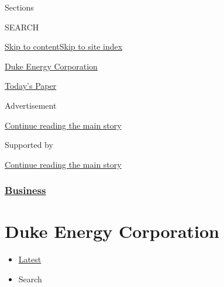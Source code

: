 Sections

SEARCH

\protect\hyperlink{site-content}{Skip to
content}\protect\hyperlink{site-index}{Skip to site index}

\href{https://www.nytimes3xbfgragh.onion/topic/company/duke-energy-corporation}{Duke
Energy Corporation}

\href{https://myaccount.nytimes3xbfgragh.onion/auth/login?response_type=cookie\&client_id=vi}{}

\href{https://www.nytimes3xbfgragh.onion/section/todayspaper}{Today's
Paper}

Advertisement

\protect\hyperlink{after-top}{Continue reading the main story}

Supported by

\protect\hyperlink{after-sponsor}{Continue reading the main story}

\hypertarget{business}{%
\subsubsection{\texorpdfstring{\href{/section/business}{Business}}{Business}}\label{business}}

\hypertarget{duke-energy-corporation}{%
\section{Duke Energy Corporation}\label{duke-energy-corporation}}

\begin{itemize}
\tightlist
\item
  \protect\hyperlink{stream-panel}{Latest}
\item
  Search
\end{itemize}

